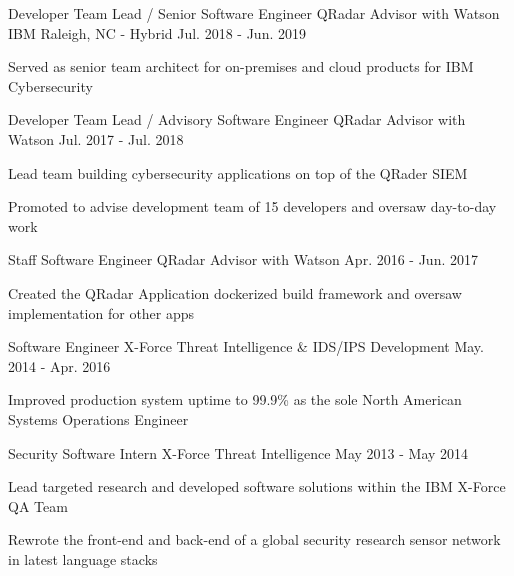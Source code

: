 \begin{cventries}
    \cventry
      {Developer Team Lead / Senior Software Engineer \enskip\textendash\enskip QRadar Advisor with Watson} %
      {IBM} %
      {Raleigh, NC - Hybrid} %
      {Jul. 2018 - Jun. 2019} %
      {
        \begin{cvitems}
          \item Served as senior team architect for on-premises and cloud products for IBM Cybersecurity
        \end{cvitems}
      }
      
    \cventry
      {Developer Team Lead / Advisory Software Engineer \enskip\textendash\enskip QRadar Advisor with Watson} %
      {} %
      {} %
      {Jul. 2017 - Jul. 2018} %
      {
        \begin{cvitems}
          \item Lead team building cybersecurity applications on top of the QRader SIEM
          \item Promoted to advise development team of 15 developers and oversaw day-to-day work
        \end{cvitems}
      }

    \cventry
      {Staff Software Engineer \enskip\textendash\enskip QRadar Advisor with Watson}
      {}
      {} %
      {Apr. 2016 - Jun. 2017}
      {
        \begin{cvitems}
          \item Created the QRadar Application dockerized build framework and oversaw implementation for other apps
        \end{cvitems}
      }
              
    \cventry
      {Software Engineer \enskip\textendash\enskip X-Force Threat Intelligence \& IDS/IPS Development}
      {}
      {} %
      {May. 2014 - Apr. 2016}
      {
      \begin{cvitems}
        \item Improved production system uptime to 99.9\% as the sole North American Systems Operations Engineer
      \end{cvitems}
      }

    \cventry
      {Security Software Intern \enskip\textendash\enskip X-Force Threat Intelligence}
      {}
      {} %
      {May 2013 - May 2014}
      {
      \begin{cvitems}
        \item Lead targeted research and developed software solutions within the IBM X-Force QA Team
        \item Rewrote the front-end and back-end of a global security research sensor network in latest language stacks
      \end{cvitems}
      }


\end{cventries}
